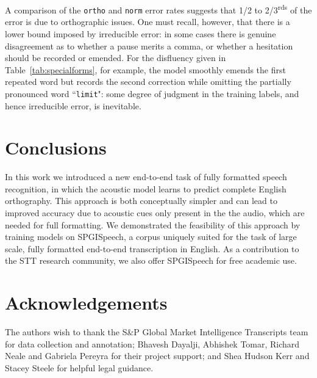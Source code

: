 \documentclass{article}
\newcommand\tabref{Table~\ref}
\newcommand{\corpus}{SPGISpeech}
\begin{document}
A comparison of the \texttt{ortho} and \texttt{norm} error rates suggests that 1/2 to 2/3\textsuperscript{rds} of the error is due to orthographic issues.  One must recall, however, that there is a lower bound imposed by irreducible error: in some cases there is genuine disagreement as to whether a pause merits a comma, or whether a hesitation should be recorded or emended.  For the disfluency given in \tabref{tab:specialforms}, for example, the model smoothly emends the first repeated word but records the second correction while omitting the partially pronounced word ``\texttt{limit}": some degree of judgment in the training labels, and hence irreducible error, is inevitable.


\section{Conclusions}\label{sec:conclusion}

In this work we introduced a new end-to-end task of fully formatted speech recognition, in which the acoustic model learns to predict complete English orthography. This approach is both conceptually simpler and can lead to improved accuracy due to acoustic cues only present in the the audio, which are needed for full formatting. We demonstrated the feasibility of this approach by training models on \corpus{}, a corpus uniquely suited for the task of large scale, fully formatted end-to-end transcription in English.  As a contribution to the STT research community, we also offer \corpus{} for free academic use.






\section{Acknowledgements}
The authors wish to thank the S\&P Global Market Intelligence Transcripts team for data collection and annotation; Bhavesh Dayalji, Abhishek Tomar, Richard Neale and Gabriela Pereyra for their project support; and Shea Hudson Kerr and Stacey Steele for helpful legal guidance. 




\end{document}
